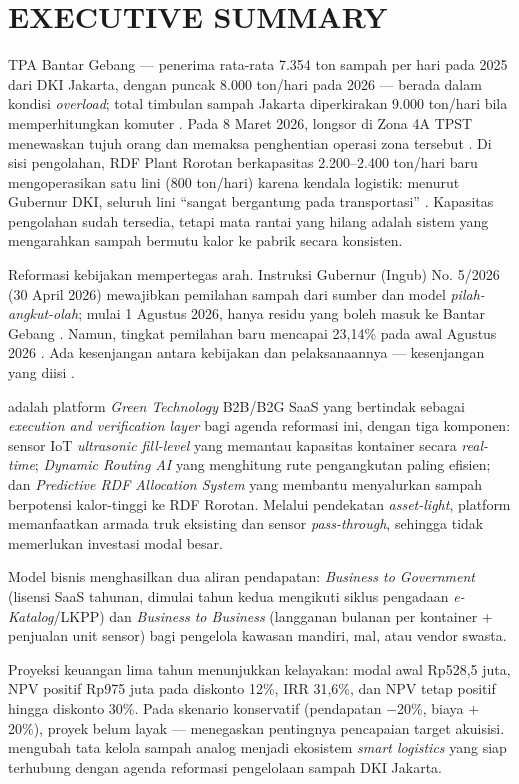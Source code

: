 \section*{\centering\fontsize{14}{21}\selectfont\bfseries EXECUTIVE SUMMARY}

TPA Bantar Gebang --- penerima rata-rata \textpm{}7.354 ton sampah per hari pada 2025 dari DKI Jakarta, dengan puncak \textpm{}8.000 ton/hari pada 2026 \parencite{dlhjakarta2026} --- berada dalam kondisi \textit{overload}; total timbulan sampah Jakarta diperkirakan \textpm{}9.000 ton/hari bila memperhitungkan komuter \parencite{kompaspunya2026}. Pada 8 Maret 2026, longsor di Zona 4A TPST menewaskan tujuh orang dan memaksa penghentian operasi zona tersebut \parencite{bbcindonesia2026}. Di sisi pengolahan, RDF Plant Rorotan berkapasitas 2.200--2.400 ton/hari baru mengoperasikan satu lini (\textpm{}800 ton/hari) karena kendala logistik: menurut Gubernur DKI, seluruh lini ``sangat bergantung pada transportasi'' \parencite{kompasrorotan2026}. Kapasitas pengolahan sudah tersedia, tetapi mata rantai yang hilang adalah sistem yang mengarahkan sampah bermutu kalor ke pabrik secara konsisten.

Reformasi kebijakan mempertegas arah. Instruksi Gubernur (Ingub) No. 5/2026 (30 April 2026) mewajibkan pemilahan sampah dari sumber dan model \textit{pilah-angkut-olah}; mulai 1 Agustus 2026, hanya residu yang boleh masuk ke Bantar Gebang \parencite{ingub5_2026}. Namun, tingkat pemilahan baru mencapai \textpm{}23,14\% pada awal Agustus 2026 \parencite{tvrinetwork2026}. Ada kesenjangan antara kebijakan dan pelaksanaannya --- kesenjangan yang diisi \ProductName{}.

\ProductName{} adalah platform \textit{Green Technology} B2B/B2G SaaS yang bertindak sebagai \textit{execution and verification layer} bagi agenda reformasi ini, dengan tiga komponen: sensor IoT \textit{ultrasonic fill-level} yang memantau kapasitas kontainer secara \textit{real-time}; \textit{Dynamic Routing AI} yang menghitung rute pengangkutan paling efisien; dan \textit{Predictive RDF Allocation System} yang membantu menyalurkan sampah berpotensi kalor-tinggi ke RDF Rorotan. Melalui pendekatan \textit{asset-light}, platform memanfaatkan armada truk eksisting dan sensor \textit{pass-through}, sehingga tidak memerlukan investasi modal besar.

Model bisnis menghasilkan dua aliran pendapatan: \textit{Business to Government} (lisensi SaaS tahunan, dimulai tahun kedua mengikuti siklus pengadaan \textit{e-Katalog}/LKPP) dan \textit{Business to Business} (langganan bulanan per kontainer + penjualan unit sensor) bagi pengelola kawasan mandiri, mal, atau vendor swasta.

Proyeksi keuangan lima tahun menunjukkan kelayakan: modal awal \textpm{}Rp528,5 juta, NPV positif \textpm{}Rp975 juta pada diskonto 12\%, IRR \textpm{}31,6\%, dan NPV tetap positif hingga diskonto \textpm{}30\%. Pada skenario konservatif (pendapatan $-$20\%, biaya $+$20\%), proyek belum layak --- menegaskan pentingnya pencapaian target akuisisi. \ProductName{} mengubah tata kelola sampah analog menjadi ekosistem \textit{smart logistics} yang siap terhubung dengan agenda reformasi pengelolaan sampah DKI Jakarta.
